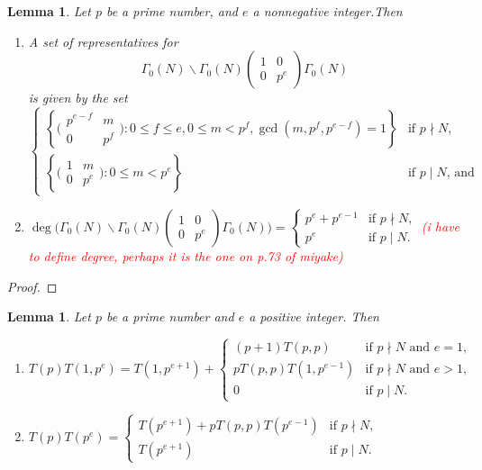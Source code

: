 \documentclass[10pt,leqno,twoside]{article}
\theoremstyle{plain}
\newtheorem{lemma}[lem]{Lemma}
\theoremstyle{definition}
\numberwithin{equation}{section}
\numberwithin{lem}{section}
\newcommand{\cbr}[1]{\left\{#1\right\}}
\newcommand{\textib}[1]{\textbf{\textit{#1\index{#1}}}} %
\newcommand{\tbd}{{\Huge\color{red}{\textib{TO DO}}}}
\newcommand{\sai}[1]{\textcolor{red}{#1}}
\begin{document}
\begin{lemma}\label{lem: miyake lem 4.5.6}
    Let $p$ be a prime number, and $e$ a nonnegative integer.Then \begin{enumerate}[label=\textup{(\arabic*)}]
        \item A set of representatives for \[\varGamma_0(N)\backslash\varGamma_0(N)\begin{pmatrix}
            1 & 0 \\ 0 & p^e
        \end{pmatrix}\varGamma_0(N)\] is given by the set \[\begin{cases}
            \cbr{\big(\!\begin{smallmatrix}
                p^{e-f} & m \\ 0 & p^f
            \end{smallmatrix}\!\big) : 0\leq f\leq e, 0\leq m < p^f, \gcd(m,p^f,p^{e-f}) = 1} & \text{if $p\nmid N$},\\
            \cbr{\big(\!\begin{smallmatrix}
                1 & m \\ 0 & p^e
            \end{smallmatrix}\!\big) : 0\leq m < p^e} & \text{if $p\mid N$, and}
        \end{cases} \]
        \item $\deg\Big(\varGamma_0(N)\backslash\varGamma_0(N)\begin{pmatrix}
            1 & 0 \\ 0 & p^e
        \end{pmatrix}\varGamma_0(N)\Big) = \begin{cases}
            p^e + p^{e-1} & \text{if $p\nmid N$,}\\
            p^e & \text{if $p\mid N$.}
        \end{cases}$ \sai{(i have to define degree, perhaps it is the one on p.73 of miyake)}
    \end{enumerate}
\end{lemma}
\begin{proof}
    \tbd
\end{proof}
\begin{lemma}\label{lem: miyake lem 4.5.7}
    Let $p$ be a prime number and $e$ a positive integer. Then \begin{enumerate}[label=\textup{(\arabic*)}]
        \item $T(p)T(1,p^e) = T(1,p^{e+1}) + \begin{cases}
            (p+1)T(p,p) & \text{if $p\nmid N$ and $e=1$,}\\
            pT(p,p)T(1,p^{e-1}) & \text{if $p\nmid N$ and $e > 1$,}\\
            0 & \text{if $p\mid N$.}
        \end{cases}$
        \item $T(p)T(p^e) = \begin{cases}
            T(p^{e+1})+pT(p,p)T(p^{e-1}) & \text{if $p\nmid N$,}\\
            T(p^{e+1}) & \text{if $p\mid N$.}
        \end{cases}$
    \end{enumerate}
\end{lemma}
\end{document}
